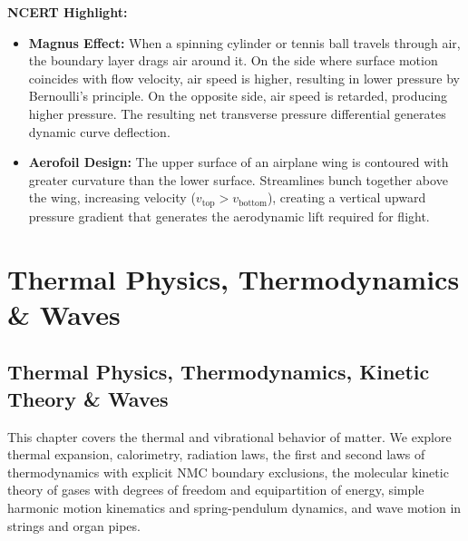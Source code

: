 \documentclass[10pt,twoside,openright]{book}
\begin{document}
\begin{ncertbox}
\textbf{NCERT Highlight:}
\begin{itemize}
  \item \textbf{Magnus Effect:} When a spinning cylinder or tennis ball travels through air, the boundary layer drags air around it. On the side where surface motion coincides with flow velocity, air speed is higher, resulting in lower pressure by Bernoulli's principle. On the opposite side, air speed is retarded, producing higher pressure. The resulting net transverse pressure differential generates dynamic curve deflection.
  \item \textbf{Aerofoil Design:} The upper surface of an airplane wing is contoured with greater curvature than the lower surface. Streamlines bunch together above the wing, increasing velocity ($v_{\text{top}} > v_{\text{bottom}}$), creating a vertical upward pressure gradient that generates the aerodynamic lift required for flight.
\end{itemize}
\end{ncertbox}

\part{Thermal Physics, Thermodynamics \& Waves}

\chapter{Thermal Physics, Thermodynamics, Kinetic Theory \& Waves}

This chapter covers the thermal and vibrational behavior of matter. We explore thermal expansion, calorimetry, radiation laws, the first and second laws of thermodynamics with explicit NMC boundary exclusions, the molecular kinetic theory of gases with degrees of freedom and equipartition of energy, simple harmonic motion kinematics and spring-pendulum dynamics, and wave motion in strings and organ pipes.
\end{document}
